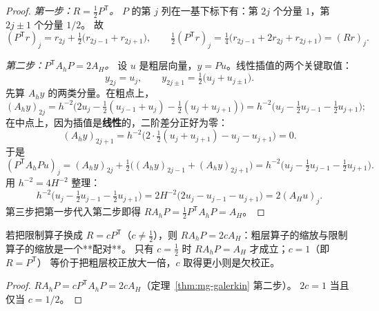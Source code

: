 \begin{proof}
\emph{第一步：$R=\frac12P^{\mathsf T}$。}
$P$ 的第 $j$ 列在一基下标下有：第 $2j$ 个分量 $1$，第 $2j\pm1$ 个分量 $1/2$。
故
\begin{equation}
  (P^{\mathsf T}r)_j=r_{2j}+\tfrac12\bigl(r_{2j-1}+r_{2j+1}\bigr),
  \qquad
  \tfrac12(P^{\mathsf T}r)_j=\tfrac14\bigl(r_{2j-1}+2r_{2j}+r_{2j+1}\bigr)=(Rr)_j .
\end{equation}

\emph{第二步：$P^{\mathsf T}A_hP=2A_H$。}
设 $u$ 是粗层向量，$y=Pu$。线性插值的两个关键取值：
\begin{equation}
  y_{2j}=u_j,\qquad y_{2j\pm1}=\tfrac12\bigl(u_j+u_{j\pm1}\bigr).
\end{equation}
先算 $A_hy$ 的两类分量。在粗点上，
\begin{equation}
  (A_hy)_{2j}=h^{-2}\bigl(2u_j-\tfrac12(u_{j-1}+u_j)-\tfrac12(u_j+u_{j+1})\bigr)
  =h^{-2}\bigl(u_j-\tfrac12u_{j-1}-\tfrac12u_{j+1}\bigr);
\end{equation}
在中点上，因为插值是\textbf{线性}的，二阶差分正好为零：
\begin{equation}
  (A_hy)_{2j+1}=h^{-2}\bigl(2\cdot\tfrac12(u_j+u_{j+1})-u_j-u_{j+1}\bigr)=0 .
\end{equation}
于是
\begin{equation}
  (P^{\mathsf T}A_hPu)_j=(A_hy)_{2j}+\tfrac12\bigl((A_hy)_{2j-1}+(A_hy)_{2j+1}\bigr)
  =h^{-2}\bigl(u_j-\tfrac12u_{j-1}-\tfrac12u_{j+1}\bigr).
\end{equation}
用 $h^{-2}=4H^{-2}$ 整理：
\begin{equation}
  h^{-2}\bigl(u_j-\tfrac12u_{j-1}-\tfrac12u_{j+1}\bigr)
  =2H^{-2}\bigl(2u_j-u_{j-1}-u_{j+1}\bigr)=2(A_Hu)_j .
\end{equation}
第三步把第一步代入第二步即得 $RA_hP=\frac12P^{\mathsf T}A_hP=A_H$。
\end{proof}

\begin{corollary}[缩放常数被恒等式定死]
\label{cor:mg-scaling}
若把限制算子换成 $R=cP^{\mathsf T}$（$c\ne\frac12$），则
$RA_hP=2cA_H$：粗层算子的缩放与限制算子的缩放是一个**配对**。
只有 $c=\frac12$ 时 $RA_hP=A_H$ 才成立；$c=1$（即 $R=P^{\mathsf T}$）
等价于把粗层校正放大一倍，$c$ 取得更小则是欠校正。
\end{corollary}

\begin{proof}
$RA_hP=cP^{\mathsf T}A_hP=2cA_H$（定理~\ref{thm:mg-galerkin} 第二步）。
$2c=1$ 当且仅当 $c=1/2$。
\end{proof}

